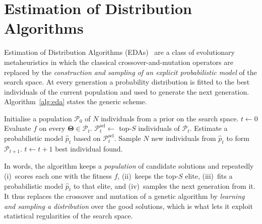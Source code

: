 \section{Estimation of Distribution Algorithms}

Estimation of Distribution Algorithms
(EDAs)~\cite{larranaga2002eda,larranaga2024edas} are a class of
evolutionary metaheuristics in which the classical
crossover-and-mutation operators are replaced by the
\emph{construction and sampling of an explicit probabilistic model}
of the search space. At every generation a probability distribution
is fitted to the best individuals of the current population and used
to generate the next generation. Algorithm~\ref{alg:eda} states the
generic scheme.

\begin{algorithm}\hfill
\label{alg:eda}
\begin{algorithmic}[1]
\State Initialise a population $\mathcal{P}_0$ of $N$ individuals from a prior on the search space.
\State $t \leftarrow 0$
\Repeat
    \State Evaluate $f$ on every $\boldsymbol{\Theta}\in\mathcal{P}_t$.
    \State $\mathcal{P}_t^{\text{sel}} \leftarrow$ top-$S$ individuals of $\mathcal{P}_t$.
    \State Estimate a probabilistic model $\hat{p}_t$ based on
           $\mathcal{P}_t^{\text{sel}}$.
    \State Sample $N$ new individuals from $\hat{p}_t$ to form
           $\mathcal{P}_{t+1}$.
    \State $t \leftarrow t+1$
\State \Return best individual found.
\end{algorithmic}
\end{algorithm}

In words, the algorithm keeps a \emph{population} of candidate solutions and
repeatedly (i)~scores each one with the fitness $f$, (ii)~keeps the top-$S$
elite, (iii)~fits a probabilistic model $\hat{p}_t$ to that elite, and
(iv)~samples the next generation from it. It thus replaces the crossover and
mutation of a genetic algorithm by \emph{learning and sampling a distribution}
over the good solutions, which is what lets it exploit statistical regularities
of the search space.

